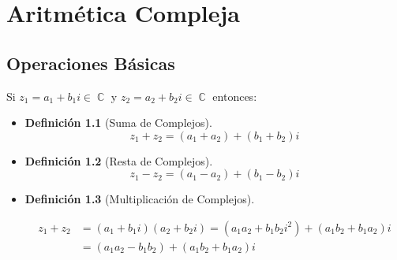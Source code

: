 \documentclass[12pt, fleqn]{report}                             %
\newtheorem{Definition}{Definición}[section]                    %
\newenvironment{MultiLineEquation}[1]                           %
        {\begin{equation}\begin{alignedat}{#1}}                     %
        {\end{alignedat}\end{equation}}                             %
\DeclareMathOperator \Complexs  {\mathbb{C}}                     %
\begin{document}
    \chapter{Aritmética Compleja}

        \clearpage
        \section{Operaciones Básicas}
            Si $z_1 = a_1 + b_1i \in \Complexs$ y $z_2 = a_2 + b_2i \in \Complexs$ entonces:

            \begin{itemize}

                \item
                    \begin{Definition}[Suma de Complejos]
                    \label{SumaComplejos}
                        \begin{equation}
                            z_1 + z_2 = (a_1+a_2) + (b_1+b_2)i
                        \end{equation}
                    \end{Definition}

                \item
                    \begin{Definition}[Resta de Complejos]
                    \label{RestaComplejos}
                        \begin{equation}
                            z_1 - z_2 = (a_1-a_2) + (b_1-b_2)i
                        \end{equation}
                    \end{Definition}

                \item 
                    \begin{Definition}[Multiplicación de Complejos]
                    \label{MultiplicacionComplejos}

                        \begin{MultiLineEquation}{1}
                            z_1+z_2 &= (a_1+b_1i)(a_2+b_2i) 
                                     = (a_1a_2 + b_1b_2i^2) + (a_1b_2 + b_1a_2)i  \\
                                    &= (a_1a_2 - b_1b_2)   + (a_1b_2 + b_1a_2)i
                        \end{MultiLineEquation}


\end{Definition}
\end{itemize}
\end{document}
